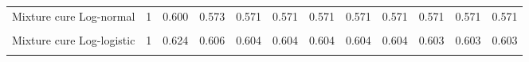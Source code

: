 \documentclass[
]{article}
\begin{document}
\begin{table}[H]
{\begin{tabular}[t]{lrrrrrrrrrrr}
Mixture cure Log-normal & 1 & 0.600 & 0.573 & 0.571 & 0.571 & 0.571 & 0.571 & 0.571 & 0.571 & 0.571 & 0.571\\
\cellcolor{gray!10}{Non-mixture cure Log-normal} & \cellcolor{gray!10}{1} & \cellcolor{gray!10}{0.597} & \cellcolor{gray!10}{0.564} & \cellcolor{gray!10}{0.561} & \cellcolor{gray!10}{0.560} & \cellcolor{gray!10}{0.560} & \cellcolor{gray!10}{0.560} & \cellcolor{gray!10}{0.560} & \cellcolor{gray!10}{0.560} & \cellcolor{gray!10}{0.560} & \cellcolor{gray!10}{0.560}\\
Mixture cure Log-logistic & 1 & 0.624 & 0.606 & 0.604 & 0.604 & 0.604 & 0.604 & 0.604 & 0.603 & 0.603 & 0.603\\
\cellcolor{gray!10}{Non-mixture cure Log-logistic} & \cellcolor{gray!10}{1} & \cellcolor{gray!10}{0.624} & \cellcolor{gray!10}{0.607} & \cellcolor{gray!10}{0.605} & \cellcolor{gray!10}{0.605} & \cellcolor{gray!10}{0.604} & \cellcolor{gray!10}{0.604} & \cellcolor{gray!10}{0.604} & \cellcolor{gray!10}{0.604} & \cellcolor{gray!10}{0.604} & \cellcolor{gray!10}{0.604}\\
\bottomrule
\end{tabular}}
\end{table}
\end{document}
